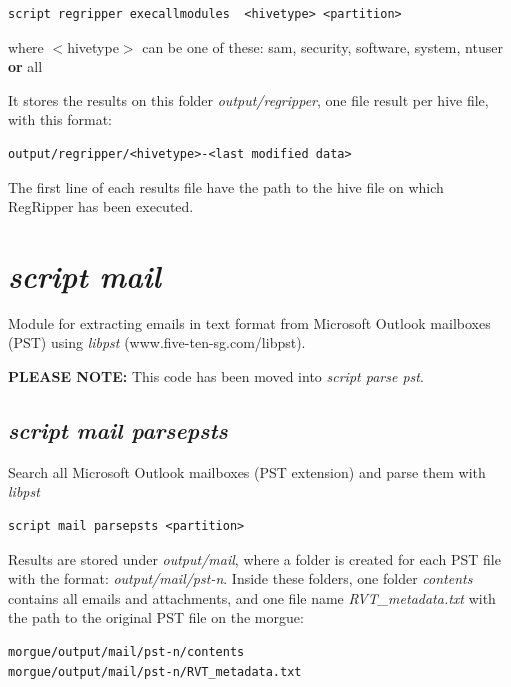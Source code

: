 \documentclass[a4paper,11pt,oneside]{report}
\begin{document}
\begin{verbatim}
script regripper execallmodules  <hivetype> <partition>
\end{verbatim}

where $<$hivetype$>$ can be one of these: sam, security, software, system, ntuser  \textbf{or} all 

It stores the results on this folder \emph{output/regripper}, one file result per hive file, with this format:

\begin{verbatim}
output/regripper/<hivetype>-<last modified data>
\end{verbatim}

The first line of each results file have the path to the hive file on which RegRipper has been executed. 





\section{\emph{script mail}}

Module for extracting emails in text format from Microsoft Outlook mailboxes (PST) using \emph{libpst} (www.five-ten-sg.com/libpst).

\textbf{PLEASE NOTE:} This code has been moved into \emph{script parse pst}.

\subsection{\emph{script mail parsepsts}}

Search all Microsoft Outlook mailboxes (PST extension) and parse them with \emph{libpst}

\begin{verbatim}
script mail parsepsts <partition>
\end{verbatim}

Results are stored under \emph{output/mail}, where a folder is created for each PST file with the format:  \emph{output/mail/pst-n}. Inside these folders, one folder \emph{contents} contains all emails and attachments, and one file name \emph{RVT\_metadata.txt} with the path to the original PST file on the morgue:

\begin{verbatim}
morgue/output/mail/pst-n/contents
morgue/output/mail/pst-n/RVT_metadata.txt
\end{verbatim}
\end{document}
